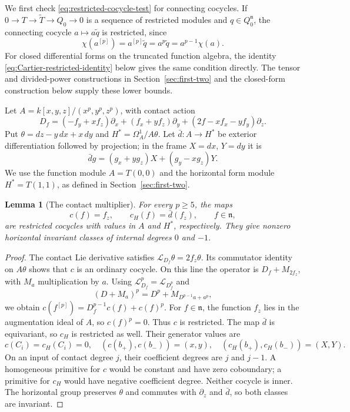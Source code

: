 \documentclass[11pt]{article}
\theoremstyle{plain}
\newtheorem{lemma}[lemma]{Lemma}
\theoremstyle{definition}
\theoremstyle{remark}
\numberwithin{equation}{section}
\newcommand{\kk}{k}
\begin{document}
We first check \eqref{eq:restricted-cocycle-test} for connecting cocycles.
If
\(0\to T\to\widetilde T\to Q_0\to0\)
is a sequence of restricted modules and \(q\in Q_0^{\mathfrak n}\),
the connecting cocycle \(a\mapsto a\widetilde q\) is restricted,
since
\[
 \chi(a^{[p]})=a^{[p]}\widetilde q
             =a^p\widetilde q=a^{p-1}\chi(a).
\]
For closed differential forms on the truncated function algebra,
the identity \eqref{eq:Cartier-restricted-identity} below gives the
same condition directly.
The tensor and divided-power constructions in
Section~\ref{sec:first-two} and the closed-form construction below
supply these lower bounds.


Let $A=\kk[x,y,z]/(x^p,y^p,z^p)$, with contact action
\[
 D_f=(-f_y+xf_z)\partial_x+(f_x+yf_z)\partial_y
                +(2f-xf_x-yf_y)\partial_z.
\]
Put $\theta=dz-y\,dx+x\,dy$ and $H^*=\Omega_A^1/A\theta$.
Let $\bar d:A\to H^*$ be exterior differentiation followed by projection;
in the frame $X=dx$, $Y=dy$ it is
\[
 \bar d g=(g_x+yg_z)X+(g_y-xg_z)Y.
\]
We use the function module $A=T(0,0)$ and the horizontal form module
$H^*=T(1,1)$, as defined in Section~\ref{sec:first-two}.

\begin{lemma}[The contact multiplier]\label{lem:contact-multiplier}
For every $p\ge5$, the maps
\[
 c(f)=f_z,\qquad c_H(f)=\bar d(f_z),\qquad f\in\mathfrak n,
\]
are restricted cocycles with values in $A$ and $H^*$, respectively.
They give nonzero horizontal invariant classes of internal degrees $0$ and $-1$.
\end{lemma}
\begin{proof}
The contact Lie derivative satisfies $\mathcal L_{D_f}\theta=2f_z\theta$.
Its commutator identity on $A\theta$ shows that $c$ is an ordinary cocycle.
On this line the operator is $D_f+M_{2f_z}$, with $M_a$ multiplication by $a$.
Using $\mathcal L_{D_f}^p=\mathcal L_{D_f^p}$ and
\[
 (D+M_a)^p=D^p+M_{D^{p-1}a+a^p},
\]
we obtain $c(f^{[p]})=D_f^{p-1}c(f)+c(f)^p$.
For $f\in\mathfrak n$, the function $f_z$ lies in the augmentation ideal
of $A$, so $c(f)^p=0$. Thus $c$ is restricted.
The map $\bar d$ is equivariant, so $c_H$ is restricted as well.
Their generator values are
\[
 c(C_i)=c_H(C_i)=0,\quad
 (c(b_+),c(b_-))=(x,y),\quad
 (c_H(b_+),c_H(b_-))=(X,Y).
\]
On an input of contact degree $j$, their coefficient degrees are $j$ and $j-1$.
A homogeneous primitive for $c$ would be constant and have zero coboundary;
a primitive for $c_H$ would have negative coefficient degree.
Neither cocycle is inner. The horizontal group preserves $\theta$ and
commutes with $\partial_z$ and $\bar d$, so both classes are invariant.
\end{proof}
\end{document}
